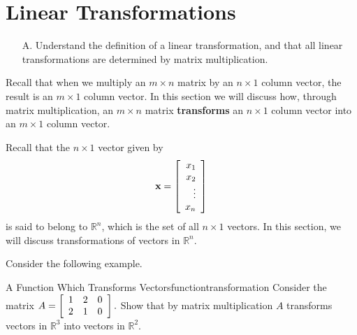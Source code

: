\section{Linear Transformations}

\begin{outcome}
\begin{enumerate}
\item[A.]  Understand the definition of a linear transformation, and that all linear transformations are determined by matrix multiplication.
\end{enumerate}
\end{outcome}

Recall that when we multiply an $m\times n$ matrix by an $n\times 1 $
column vector, the result is an $m\times 1$ column vector. In this
section we will discuss how, through matrix multiplication, an $m
\times n$ matrix \textbf{transforms} an $n\times 1$ column vector into
an $m \times 1$ column vector.

Recall that the $n \times 1$ vector given by
\begin{equation*}
{\bf x} = 
\left[
\begin{array}{r}
x_1 \\
x_2\\ 
\vdots \\
x_n
\end{array}
\right]
\end{equation*}
is said to belong to $\mathbb{R}^n$, which is the set of all $n \times 1$ vectors. In this section, we will discuss transformations of vectors in $\mathbb{R}^n.$ 

Consider the following example. 

\begin{example}{A Function Which Transforms Vectors}{functiontransformation}
Consider the matrix $A = \left[
\begin{array}{ccc}
1 & 2 & 0 \\
2 & 1 & 0
\end{array}
\right] .$ 
Show that by matrix multiplication $A$ transforms vectors in $\mathbb{R}^3$ into vectors in $\mathbb{R}^2$.
\end{example}

